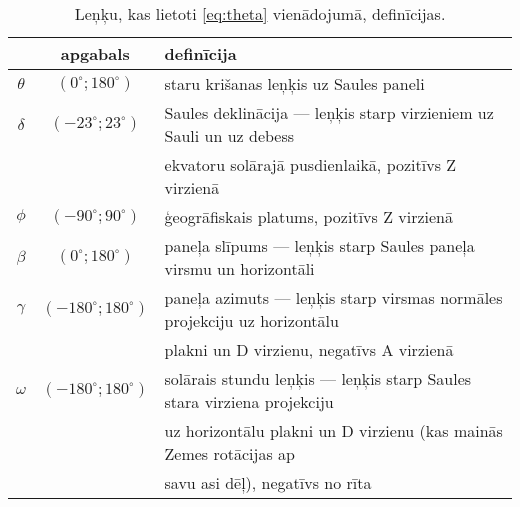 \begin{table}[h!]
	\caption{Leņķu, kas lietoti \ref{eq:theta} vienādojumā, definīcijas.}
	\begin{center}
		\begin{tabular}{|c|c|l|}
			\hline
			         &         apgabals         & definīcija                                                                 \\ \hline\hline
			$\theta$ &  $(0^\circ;180^\circ)$   & staru krišanas leņķis uz Saules paneli                                     \\ \hline
			$\delta$ &  $(-23^\circ;23^\circ)$  & Saules deklinācija --- leņķis starp virzieniem uz Sauli un uz debess       \\
			         &                          & ekvatoru solārajā pusdienlaikā, pozitīvs Z virzienā                        \\ \hline
			 $\phi$  &  $(-90^\circ;90^\circ)$  & ģeogrāfiskais platums, pozitīvs Z virzienā                                 \\ \hline
			$\beta$  &  $(0^\circ;180^\circ)$   & paneļa slīpums --- leņķis starp Saules paneļa virsmu un horizontāli        \\ \hline
			$\gamma$ & $(-180^\circ;180^\circ)$ & paneļa azimuts --- leņķis starp virsmas normāles projekciju uz horizontālu \\
			         &                          & plakni un D virzienu, negatīvs A virzienā                                  \\ \hline
			$\omega$ & $(-180^\circ;180^\circ)$ & solārais stundu leņķis --- leņķis starp Saules stara virziena projekciju   \\
			         &                          & uz horizontālu plakni un D virzienu (kas mainās Zemes rotācijas ap         \\
			         &                          & savu asi dēļ), negatīvs no rīta                                            \\ \hline
		\end{tabular}
	\end{center}
	\label{tab:theta}
\end{table}


